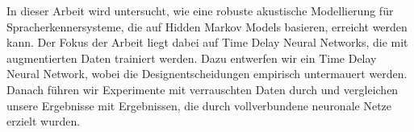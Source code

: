 
\abstract
In dieser Arbeit wird untersucht, wie eine robuste akustische Modellierung für Spracherkennersysteme, die auf Hidden Markov Models basieren, erreicht werden kann. Der Fokus der Arbeit liegt dabei auf Time Delay Neural Networks, die mit augmentierten Daten trainiert werden. Dazu entwerfen wir ein Time Delay Neural Network, wobei die Designentscheidungen empirisch untermauert werden. Danach führen wir Experimente mit verrauschten Daten durch und vergleichen unsere Ergebnisse mit Ergebnissen, die durch vollverbundene neuronale Netze erzielt wurden. 